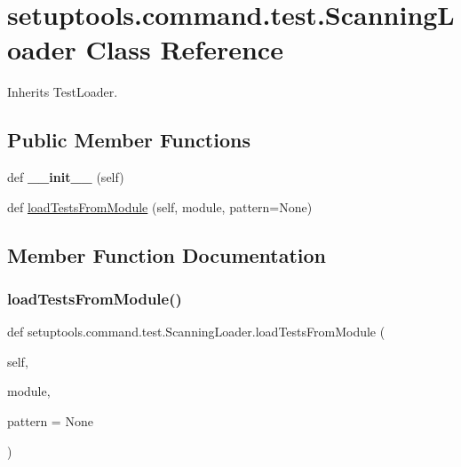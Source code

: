 \hypertarget{classsetuptools_1_1command_1_1test_1_1_scanning_loader}{}\section{setuptools.\+command.\+test.\+Scanning\+Loader Class Reference}
\label{classsetuptools_1_1command_1_1test_1_1_scanning_loader}


Inherits Test\+Loader.

\subsection*{Public Member Functions}
\begin{DoxyCompactItemize}
\item 
\mbox{\label{classsetuptools_1_1command_1_1test_1_1_scanning_loader_a9df24af42cc35c3b5a7cad05769eb3f4}} 
def {\bfseries \+\_\+\+\_\+init\+\_\+\+\_\+} (self)
\item 
def \hyperlink{classsetuptools_1_1command_1_1test_1_1_scanning_loader_a29cd676380d82375863012b7cc1feb80}{load\+Tests\+From\+Module} (self, module, pattern=None)
\end{DoxyCompactItemize}


\subsection{Member Function Documentation}
\mbox{\label{classsetuptools_1_1command_1_1test_1_1_scanning_loader_a29cd676380d82375863012b7cc1feb80}} 
\subsubsection{\texorpdfstring{load\+Tests\+From\+Module()}{loadTestsFromModule()}}
{\footnotesize\ttfamily def setuptools.\+command.\+test.\+Scanning\+Loader.\+load\+Tests\+From\+Module (\begin{DoxyParamCaption}\item[{}]{self,  }\item[{}]{module,  }\item[{}]{pattern = {\ttfamily None} }\end{DoxyParamCaption})}

